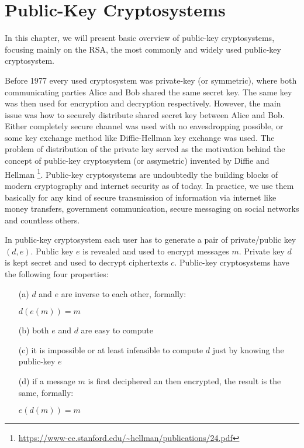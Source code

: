 \chapter{Public-Key Cryptosystems}

In this chapter, we will present basic overview of public-key cryptosystems, focusing mainly on the RSA, the most commonly and widely used public-key cryptosystem. 

Before 1977 every used cryptosystem was private-key (or symmetric), where both communicating parties Alice and Bob shared the same secret key. The same key was then used for encryption and decryption respectively. However, the main issue was how to securely distribute shared secret key between Alice and Bob. Either completely secure channel was used with no eavesdropping possible, or some key exchange method like Diffie-Hellman key exchange\cite{diffie_hellman} was used. The problem of distribution of the private key served as the motivation behind the concept of public-key cryptosystem (or assymetric) invented by Diffie and Hellman \cite{diffie_hellman}\footnote{\url{https://www-ee.stanford.edu/~hellman/publications/24.pdf}}. Public-key cryptosystems are undoubtedly the building blocks of modern cryptography and internet security as of today. In practice, we use them basically for any kind of secure transmission of information via internet like money transfers, government communication, secure messaging on social networks and countless others.

In public-key cryptosystem each user has to generate a pair of private/public key $(d,e)$. Public key $e$ is revealed and used to encrypt messages $m$. Private key $d$ is kept secret and used to decrypt ciphertexts $c$. Public-key cryptosystems have the following four properties:

\begin{itemize}

	\item[(a)] $d$ and $e$ are inverse to each other, formally:

$d(e(m)) = m$

	\item[(b)] both $e$ and $d$ are easy to compute

	\item[(c)] it is impossible or at least infeasible to compute $d$ just by knowing the public-key $e$

	\item[(d)] if a message $m$ is first deciphered an then encrypted, the result is the same, formally:
    
$e(d(m)) = m$

\end{itemize}

